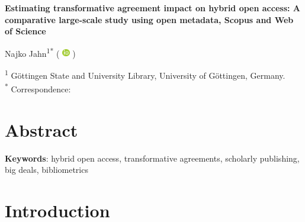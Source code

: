 \documentclass[a4paper,man,floatsintext,longtable,noextraspace,10pt]{apa6}
\begin{document}
\thispagestyle{otherpage}


\begin{large}
\textbf{Estimating transformative agreement impact on hybrid open access: A comparative large-scale study using open metadata, Scopus and Web of Science}
\end{large}

\newcommand{\orcid}{%
  \begingroup\normalfont
  \includegraphics[height=0.9em]{orcid_logo}%
  \endgroup
}

Najko Jahn\textsuperscript{1}\textsuperscript{*} 
(\orcid{} \href{https://orcid.org/0000-0001-5105-1463}{\color{black}{0000-0001-5105-1463}})

\textsuperscript{1} Göttingen State and University Library, University of Göttingen, Germany. \\

\textsuperscript{*} Correspondence: \href{mailto:najko.jahn@sub.uni-goettingen.de}{\color{black}{najko.jahn@sub.uni-goettingen.de}} 

\section*{Abstract}
{}
{\textbf{Keywords}: hybrid open access, transformative agreements, scholarly publishing, big deals, bibliometrics}

\newpage

\setcounter{secnumdepth}{2}

\section{Introduction}\label{introduction}
\end{document}
